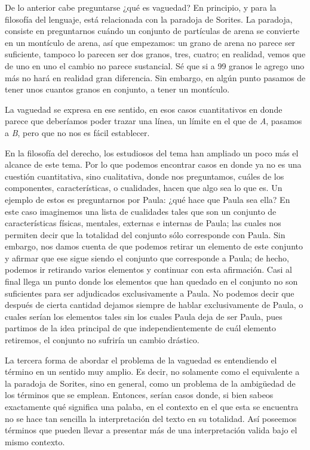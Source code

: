 \documentclass[]{book}
\begin{document}
De lo anterior cabe preguntarse ¿qué es vaguedad? En principio, y para
la filosofía del lenguaje, está relacionada con la paradoja de Sorites.
La paradoja, consiste en preguntarnos cuándo un conjunto de partículas
de arena se convierte en un montículo de arena, así que empezamos: un
grano de arena no parece ser suficiente, tampoco lo parecen ser dos
granos, tres, cuatro; en realidad, vemos que de uno en uno el cambio no
parece sustancial. Sé que si a 99 granos le agrego uno más no hará en
realidad gran diferencia. Sin embargo, en algún punto pasamos de tener
unos cuantos granos en conjunto, a tener un montículo.

La vaguedad se expresa en ese sentido, en esos casos cuantitativos en
donde parece que deberíamos poder trazar una línea, un límite en el que
de \emph{A}, pasamos a \emph{B}, pero que no nos es fácil establecer.

En la filosofía del derecho, los estudiosos del tema han ampliado un
poco más el alcance de este tema. Por lo que podemos encontrar casos en
donde ya no es una cuestión cuantitativa, sino cualitativa, donde nos
preguntamos, cuáles de los componentes, características, o cualidades,
hacen que algo sea lo que es. Un ejemplo de estos es preguntarnos por
Paula: ¿qué hace que Paula sea ella? En este caso imaginemos una lista
de cualidades tales que son un conjunto de características físicas,
mentales, externas e internas de Paula; las cuales nos permiten decir
que la totalidad del conjunto sólo corresponde con Paula. Sin embargo,
nos damos cuenta de que podemos retirar un elemento de este conjunto y
afirmar que ese sigue siendo el conjunto que corresponde a Paula; de
hecho, podemos ir retirando varios elementos y continuar con esta
afirmación. Casi al final llega un punto donde los elementos que han
quedado en el conjunto no son suficientes para ser adjudicados
exclusivamente a Paula. No podemos decir que después de cierta cantidad
dejamos siempre de hablar exclusivamente de Paula, o cuales serían los
elementos tales sin los cuales Paula deja de ser Paula, pues partimos de
la idea principal de que independientemente de cuál elemento retiremos,
el conjunto no sufriría un cambio drástico.

La tercera forma de abordar el problema de la vaguedad es entendiendo el
término en un sentido muy amplio. Es decir, no solamente como el
equivalente a la paradoja de Sorites, sino en general, como un problema
de la ambigüedad de los términos que se emplean. Entonces, serían casos
donde, si bien sabeos exactamente qué significa una palaba, en el
contexto en el que esta se encuentra no se hace tan sencilla la
interpretación del texto en su totalidad. Así poseemos términos que
pueden llevar a presentar más de una interpretación valida bajo el mismo
contexto.
\end{document}
